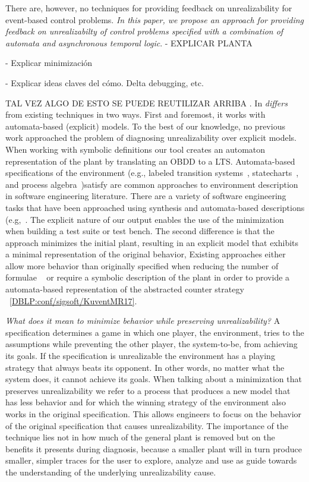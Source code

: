 There are, however, no techniques for providing feedback on unrealizability for 
event-based control problems. \emph{In this paper, we propose an approach for  
providing  feedback on unrealizabilty of control problems specified with a combination of 
automata and asynchronous temporal logic}.
- EXPLICAR PLANTA

- Explicar minimización

- Explicar ideas claves del cómo. Delta debugging, etc.





TAL VEZ ALGO DE ESTO SE PUEDE REUTILIZAR  ARRIBA
. In \textit{differs} from existing techniques in two ways. First and foremost, it works 
with automata-based (explicit) models. To the best of our knowledge, no previous work 
approached the problem of diagnosing unrealizability over explicit models.  When 
working with symbolic definitions our tool creates an automaton representation of the 
plant by translating an OBDD to a LTS. Automata-based specifications of the 
environment (e.g., labeled transition systems~\cite{Keller:1976}, 
statecharts~\cite{Harel:1987}, and process 
algebra~\cite{Milner:1982,Hoare:1983})satisfy are common approaches to 
environment description in software engineering literature. There are a variety of 
software engineering tasks that have been approached using synthesis and 
automata-based descriptions 
(e.g,~\cite{Letier:2013:RMS,DIppolito:2013,Pistore:2004:PMW}. The explicit nature 
of our output enables the use of the minimization when building a test suite or test 
bench. The second difference is that the approach minimizes the initial plant, resulting 
in an explicit model that exhibits a minimal representation of the original behavior,  
Existing approaches either allow more behavior than originally specified when reducing 
the number of formulae ~\cite{DBLP:conf/fmcad/KonighoferHB09} or require a 
symbolic description of the plant in order to provide a automata-based representation of 
the abstracted counter strategy ~\ref{DBLP:conf/sigsoft/KuventMR17}. 




\textit{What does it mean to minimize behavior while preserving unrealizability?} A 
specification determines a game in which one player, the environment, tries to  the 
assumptions while preventing the other player, the system-to-be, from achieving its 
goals. If the specification is unrealizable the environment has a playing strategy that 
always beats its opponent. In other words, no matter what the system does, it cannot 
achieve its goals. When talking about a minimization that preserves unrealizability we 
refer to a process that produces a new model that has less behavior and for which the 
winning strategy of the environment also works in the original specification. This allows 
engineers to focus on the behavior of the original specification that causes 
unrealizability. The importance of the technique lies not in how much of the general 
plant is removed but on the benefits it presents during diagnosis, because a smaller plant 
will in turn produce smaller, simpler traces for the user to explore, analyze and use as 
guide towards the understanding of the underlying unrealizability cause.



